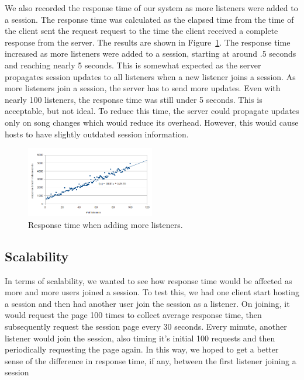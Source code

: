 We also recorded the response time of our system as more listeners
were added to a session. The response time was calculated as the
elapsed time from the time of the client sent the request request
to the time the client
received a complete response from the server. The results are shown in
Figure~\ref{fig:addListenersResponseTime}. The response time
increased as more listeners were added to a session, starting at
around .5 seconds and reaching nearly 5 seconds. This is somewhat
expected as the server propagates session updates to all listeners
when a new listener joins a session. As more listeners join a
session, the server has to send more updates. Even with nearly
100 listeners, the response time was still under 5 seconds. This
is acceptable, but not ideal. To reduce this time, the server
could propagate updates only on song changes which would reduce
its overhead. However, this would cause hosts to have slightly
outdated session information.

\begin{figure}[h]
	\centering
	\includegraphics[width=0.5\textwidth]{add_listeners_response_time.png}
	\caption{Response time when adding more listeners.}
	\label{fig:addListenersResponseTime}
\end{figure}

\subsection{Scalability}
In terms of scalability, we wanted to see how response 
time would be affected as more and more users joined a session. 
To test this, we had one client start hosting a session and then had 
another user join the session as a listener. On joining, it would request 
the page 100 times to collect average response time, 
then subsequently request the session page every 30 seconds. 
Every minute, another listener would join the session, also timing it's initial 
100 requests and then periodically requesting the page again. In this way, 
we hoped to get a better sense of the difference in response time, if any, 
between the first listener joining a session
